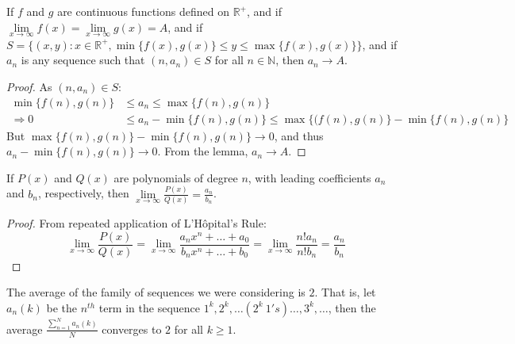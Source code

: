         \begin{theorem}
        If $f$ and $g$ are continuous functions defined on $\mathbb{R}^+$, and if $\underset{x\rightarrow \infty}\lim f(x) = \underset{x\rightarrow \infty}\lim g(x)=A$, and if $S = \{(x,y):x\in \mathbb{R}^+,\min\{f(x),g(x)\}\leq y \leq \max\{f(x),g(x)\}\}$, and if $a_n$ is any sequence such that $(n,a_n)\in S$ for all $n\in \mathbb{N}$, then $a_n \rightarrow A$.
        \end{theorem}
        \begin{proof}
        As $(n,a_n)\in S$:
        \begin{align*}
            \min\{f(n),g(n)\} &\leq a_n \leq \max\{f(n),g(n)\}\\
            \Rightarrow 0 &\leq a_n - \min\{f(n),g(n)\} \leq \max\{(f(n),g(n)\}-\min\{f(n),g(n)\}    
        \end{align*}
        But $\max\{f(n),g(n)\}-\min\{f(n),g(n)\} \rightarrow 0$, and thus $a_n - \min\{f(n),g(n)\} \rightarrow 0$. From the lemma, $a_n \rightarrow A$.
        \end{proof}
        \begin{theorem}
        If $P(x)$ and $Q(x)$ are polynomials of degree $n$, with leading coefficients $a_n$ and $b_n$, respectively, then $\underset{x\rightarrow \infty}\lim \frac{P(x)}{Q(x)} = \frac{a_n}{b_n}$.
        \end{theorem}
        \begin{proof}
        From repeated application of L'H\^{o}pital's Rule:
        \begin{equation*}
            \underset{x\rightarrow \infty}\lim \frac{P(x)}{Q(x)} = \underset{x\rightarrow \infty}\lim \frac{a_n x^n + \hdots + a_0}{b_n x^n + \hdots + b_0} = \underset{x\rightarrow \infty} \lim\frac{n! a_n}{n! b_n} = \frac{a_n}{b_n}
        \end{equation*}
        \end{proof}
        \begin{theorem}
        The average of the family of sequences we were considering is $2$. That is, let $a_n(k)$ be the $n^{th}$ term in the sequence $1^k, 2^k, \hdots (2^k\ 1's)\hdots,3^k,\hdots$, then the average $\frac{\sum_{n=1}^{N} a_n(k)}{N}$ converges to $2$ for all $k\geq 1$.
        \end{theorem}
